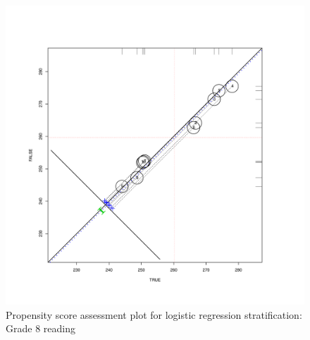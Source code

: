 \clearpage
\begin{figure}[h!]
\begin{center}
\includegraphics[height=.4\textheight,width=.4\textheight]{../Figures2009/g8read-circpsa10.pdf}
\caption{Propensity score assessment plot for logistic regression stratification: Grade 8 reading}
\end{center}
\end{figure}



